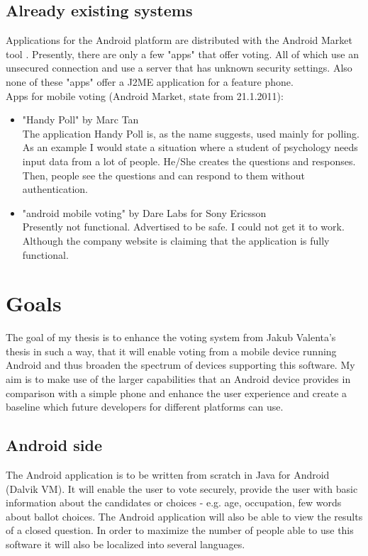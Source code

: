 \documentclass[11pt,twoside,a4paper]{book}
\begin{document}
\subsection{Already existing systems}
Applications for the Android platform are distributed with the Android Market tool \cite{MarketAnd}. Presently, there are only a few "apps"  that offer voting. All of which use an unsecured connection and use a server that has unknown security settings. Also none of these "apps" offer a J2ME application for a feature phone. \\
Apps for mobile voting (Android Market, state from 21.1.2011): 
\begin{itemize}
\item "Handy Poll" by Marc Tan \cite{HandyPoll} \\
The application Handy Poll is, as the name suggests, used mainly for polling. As an example I would state a situation where a student of psychology needs input data from a lot of people. He/She creates the questions and responses. Then, people see the questions and can respond to them without authentication.
\item "android mobile voting" by Dare Labs for Sony Ericsson \cite{DareLabs}\\
Presently not functional. Advertised to be safe. I could not get it to work. Although the company website \cite{DareLabsWeb} is claiming that the application is fully functional.
\end{itemize}



\section{Goals}

The goal of my thesis is to enhance the voting system from Jakub Valenta's\cite{bakalarkaJV} thesis in such a way, that it will enable voting from a mobile device running Android\cite{whatisAnd} and thus broaden the spectrum of devices supporting this software. My aim is to make use of the larger capabilities that an Android device provides in comparison with a simple phone and enhance the user experience and create a baseline which future developers for different platforms can use. 

\subsection{Android side}
The Android application is to be written from scratch in Java for Android (Dalvik VM\cite{DalvikVM}). It will enable the user to vote securely, provide the user with basic information about the candidates or choices - e.g. age, occupation, few words about ballot choices. The Android application will also be able to view the results of a closed question. In order to maximize the number of people able to use this software it will also be localized into several languages.
\end{document}
